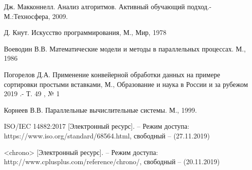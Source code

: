 \documentclass[a4paper,14pt]{report}
\begin{document}
\begin{thebibliography}{10}

Дж. Макконнелл. Анализ алгоритмов. Активный 
обучающий 
подход.-М.:Техносфера, 2009.

Д. Кнут. Искусство программирования, М., Мир, 1978

Воеводин В.В. Математические модели и методы в параллельных процессах. М., 1986

Погорелов Д.А. Применение конвейерной обработки данных на примере сортировки простыми вставками, М., Образование и наука в России и за рубежом
2019 .- Т. 49 , № 1

Корнеев В.В. Параллельные вычислительные системы. М., 1999.

ISO/IEC 14882:2017 [Электронный ресурс]. – Режим доступа: https://www.iso.org/standard/68564.html, свободный – (27.11.2019)

<chrono> [Электронный ресурс]. – Режим доступа: http://www.cplusplus.com/reference/chrono/, свободный – (20.11.2019)

\end{thebibliography}
\end{document}
